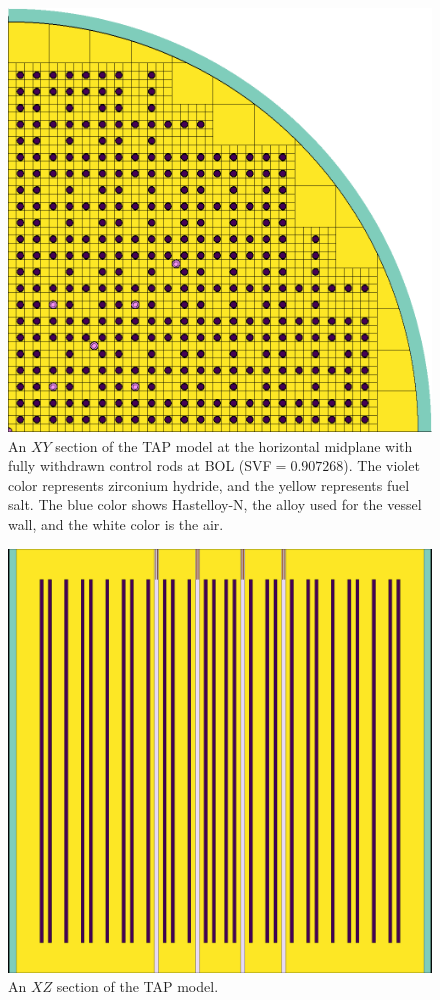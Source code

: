 \documentclass[12pt]{article} %
\begin{document}
\begin{figure}[htp!] %
  \centering
		  \includegraphics[width=\textwidth]{tap_plan_view.png}
  \caption{An $XY$ section of the \gls{TAP} model at the horizontal midplane 
  with fully withdrawn control rods at \gls{BOL} (\gls{SVF}$=0.907268$). 
  The violet color represents zirconium hydride, and the yellow represents 
  fuel salt. The blue color shows Hastelloy-N, the alloy used for the vessel 
  wall, and the white color is the air.}
  \label{fig:tap-serpent-plan}
\end{figure}
\begin{figure}[htp!] %
  \centering
		  \includegraphics[width=\textwidth]{tap_elev_view.png}
		 \vspace{-0.35in}
  \caption{An $XZ$ section of the \gls{TAP} model.}
  \label{fig:tap-serpent-elev}
\end{figure}
\end{document}
